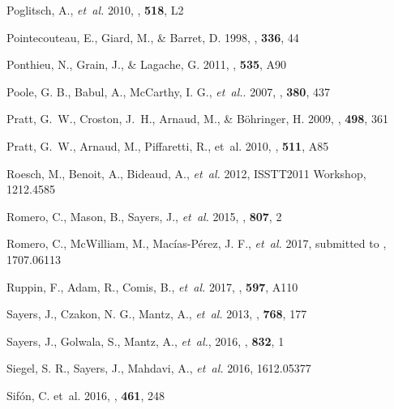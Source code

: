 \documentclass[traditabstract]{aa}
\begin{document}
\begin{thebibliography}{81}
Poglitsch, A., \emph{et~al.} 2010, \aap, \textbf{518}, L2

Pointecouteau, E., Giard, M., \& Barret, D. 1998, \aap, \textbf{336}, 44

Ponthieu, N., Grain, J., \& Lagache, G. 2011, \aap, \textbf{535}, A90

Poole, G. B., Babul, A., McCarthy, I. G., \emph{et~al.}. 2007, \mnras, \textbf{380}, 437

{Pratt}, G.~W., {Croston}, J.~H., {Arnaud}, M., \& {B{\"o}hringer}, H. 2009,
  \aap, \textbf{498}, 361
  
Pratt, G.~W., Arnaud, M., Piffaretti, R., {et~al.} 2010, \aap, \textbf{511}, A85

Roesch, M., Benoit, A., Bideaud, A., \emph{et~al.} 2012, ISSTT2011 Workshop, 1212.4585

Romero, C., Mason, B., Sayers, J., \emph{et~al.} 2015, \apj, \textbf{807}, 2

Romero, C., McWilliam, M., Mac\'ias-P\'erez, J. F., \emph{et~al.} 2017, submitted to \aap, 1707.06113
  
Ruppin, F., Adam, R., Comis, B., \emph{et~al.} 2017, \aap, \textbf{597}, A110

{Sayers}, J., {Czakon}, N. G., {Mantz}, A., \emph{et~al.} 2013, \apj, \textbf{768}, 177

Sayers, J., Golwala, S., Mantz, A., \emph{et~al.},  2016, \apj, \textbf{832}, 1
  
Siegel, S. R., Sayers, J., Mahdavi, A., \emph{et~al.} 2016, 1612.05377
  
{Sif{\'o}n}, C. {et~al.} 2016, \mnras, \textbf{461}, 248
  

\end{thebibliography}
\end{document}
